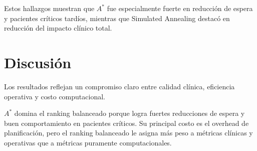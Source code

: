 \documentclass[12pt,a4paper]{article}
\begin{document}
\begin{table}[H]
\centering
\begin{small}
%
\end{small}
\caption{Hallazgos principales contra FIFO como línea base.}
\label{tab:hallazgos-fifo}
\end{table}

Estos hallazgos muestran que $A^*$ fue especialmente fuerte en reducción de espera y pacientes críticos tardíos, mientras que Simulated Annealing destacó en reducción del impacto clínico total.

\section{Discusión}

Los resultados reflejan un compromiso claro entre calidad clínica, eficiencia operativa y costo computacional.

$A^*$ domina el ranking balanceado porque logra fuertes reducciones de espera y buen comportamiento en pacientes críticos. Su principal costo es el overhead de planificación, pero el ranking balanceado le asigna más peso a métricas clínicas y operativas que a métricas puramente computacionales.
\end{document}

